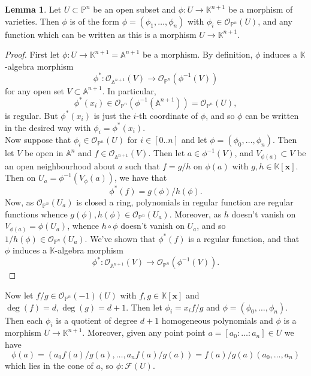 \documentclass{article}
\theoremstyle{definition}
\newtheorem{lemma}[theorem]{Lemma}
\newcommand{\K}{\mathbb{K}}
\renewcommand{\P}{\mathbb{P}}
\newcommand{\A}{\mathbb{A}}
\newcommand{\Kx}{\K[\bm{x}]}
\newcommand{\An}{\A^n}
\newcommand{\Ano}{\A^{n + 1}}
\newcommand{\Pn}{\P^n}
\begin{document}
\begin{lemma}
	Let $U \subset \Pn$ be an open subset and $\phi : U \to \K^{n + 1}$ be a
	morphism of varieties. Then $\phi$ is of the form $\phi = (\phi_1, \ldots,
	\phi_n)$ with $\phi_i \in \mathcal{O}_{\Pn}(U)$, and any function which can 
	be written as this is a morphism $U \to \K^{n + 1}$.
\end{lemma}
\begin{proof}
	First let $\phi : U \to \K^{n + 1} = \Ano$ be a morphism. By definition,
	$\phi$ induces a $\K$-algebra morphism
	\[
		\phi^{*} : 
		\mathcal{O}_{\Ano}(V)
		\to 
		\mathcal{O}_{\Pn}(\phi^{-1}(V))
	\]
	for any open set $V \subset \Ano$. In particular,
	\[
		\phi^{*}(x_i) \in \mathcal{O}_{\Pn}(\phi^{-1}(\Ano)) = \mathcal{O}_{\Pn}(U),
	\]
	is regular. But $\phi^{*}(x_i)$ is just the $i$-th coordinate of $\phi$,
	and so $\phi$ can be written in the desired way with $\phi_i =
	\phi^{*}(x_i)$. \\

	Now suppose that $\phi_i \in \mathcal{O}_{\Pn}(U)$ for $i \in [0..n]$ and
	let $\phi = (\phi_0, \ldots, \phi_{n})$. Then let $V$ be open in $\An$ and
	$f \in \mathcal{O}_{\Ano}(V)$. Then let $a \in \phi^{-1}(V)$, and
	$V_{\phi(a)} \subset V$ be an open neighbourhood about $a$ such that $f =
	g/h$ on $\phi(a)$ with $g, h \in \Kx$. Then on $U_a = \phi^{-1}(V_\phi(a))$,
	we have that 
	\[
		\phi^{*}(f) = g(\phi)/h(\phi).
	\] 
	Now, as $\mathcal{O}_{\Pn}(U_{a})$ is closed a ring, polynomials in regular
	function are regular functions whence $g(\phi), h(\phi) \in
	\mathcal{O}_{\Pn}(U_{a})$. Moreover, as $h$ doesn't vanish on $V_{\phi(a)}
	= \phi(U_{a})$, whence $h \circ \phi$ doesn't vanish on $U_a$, and so
	$1/h(\phi) \in \mathcal{O}_{\Pn}(U_a)$. We've shown that $\phi^{*}(f)$ is a
	regular function, and that $\phi$ induces a $\K$-algebra morphism
	\[
		\phi^{*} : 
		\mathcal{O}_{\Ano}(V)
		\to 
		\mathcal{O}_{\Pn}(\phi^{-1}(V)).
	\]
\end{proof}

Now let $f/g \in \mathcal{O}_{\Pn}(-1)(U)$ with $f, g \in \Kx$ and $\deg(f) =
d, \deg(g) = d + 1$. Then let $\phi_i = x_i f/g$ and $\phi = (\phi_0, \ldots,
\phi_n)$. Then each $\phi_i$ is a quotient of degree $d + 1$ homogeneous
polynomials and $\phi$ is a morphism $U \to \K^{n + 1}$. Moreover, given any
point point $a = [a_0 : \ldots : a_n] \in U$ we have 
\[
	\phi(a)
	=
	(a_0 f(a)/g(a), \ldots, a_n f(a)/g(a))
	=
	f(a)/g(a)(a_0, \ldots, a_n)
\] 
which lies in the cone of $a$, so $\phi : \mathcal{F}(U)$. \\
\end{document}
